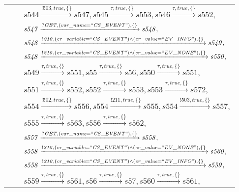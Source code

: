 \begin{tabular}{lcp{350px}}
& & $\mathit{s544}\xrightarrow{\mathit{!503}, \mathit{true}, \{\}}\mathit{s547},\mathit{s545}\xrightarrow{\mathit{\tau}, \mathit{true}, \{\}}\mathit{s553},\mathit{s546}\xrightarrow{\mathit{\tau}, \mathit{true}, \{\}}\mathit{s552},$ \\
& & $\mathit{s547}\xrightarrow{\mathit{?GET}, \mathit{(var\_name = ``CS\_EVENT")}, \{\}}\mathit{s548},$ \\
& & $\mathit{s548}\xrightarrow{\mathit{!210}, \mathit{(cr\_variable = ``CS\_EVENT") \land (cr\_value = ``EV\_INFO")}, \{\}}\mathit{s549},$ \\
& & $\mathit{s548}\xrightarrow{\mathit{!210}, \mathit{(cr\_variable = ``CS\_EVENT") \land (cr\_value = ``EV\_NONE")}, \{\}}\mathit{s550},$ \\
& & $\mathit{s549}\xrightarrow{\mathit{\tau}, \mathit{true}, \{\}}\mathit{s551},\mathit{s55}\xrightarrow{\mathit{\tau}, \mathit{true}, \{\}}\mathit{s56},\mathit{s550}\xrightarrow{\mathit{\tau}, \mathit{true}, \{\}}\mathit{s551},$ \\
& & $\mathit{s551}\xrightarrow{\mathit{\tau}, \mathit{true}, \{\}}\mathit{s552},\mathit{s552}\xrightarrow{\mathit{\tau}, \mathit{true}, \{\}}\mathit{s553},\mathit{s553}\xrightarrow{\mathit{\tau}, \mathit{true}, \{\}}\mathit{s572},$ \\
& & $\mathit{s554}\xrightarrow{\mathit{!502}, \mathit{true}, \{\}}\mathit{s556},\mathit{s554}\xrightarrow{\mathit{!211}, \mathit{true}, \{\}}\mathit{s555},\mathit{s554}\xrightarrow{\mathit{!503}, \mathit{true}, \{\}}\mathit{s557},$ \\
& & $\mathit{s555}\xrightarrow{\mathit{\tau}, \mathit{true}, \{\}}\mathit{s563},\mathit{s556}\xrightarrow{\mathit{\tau}, \mathit{true}, \{\}}\mathit{s562},$ \\
& & $\mathit{s557}\xrightarrow{\mathit{?GET}, \mathit{(var\_name = ``CS\_EVENT")}, \{\}}\mathit{s558},$ \\
& & $\mathit{s558}\xrightarrow{\mathit{!210}, \mathit{(cr\_variable = ``CS\_EVENT") \land (cr\_value = ``EV\_NONE")}, \{\}}\mathit{s560},$ \\
& & $\mathit{s558}\xrightarrow{\mathit{!210}, \mathit{(cr\_variable = ``CS\_EVENT") \land (cr\_value = ``EV\_INFO")}, \{\}}\mathit{s559},$ \\
& & $\mathit{s559}\xrightarrow{\mathit{\tau}, \mathit{true}, \{\}}\mathit{s561},\mathit{s56}\xrightarrow{\mathit{\tau}, \mathit{true}, \{\}}\mathit{s57},\mathit{s560}\xrightarrow{\mathit{\tau}, \mathit{true}, \{\}}\mathit{s561},$ \\
\end{tabular}

